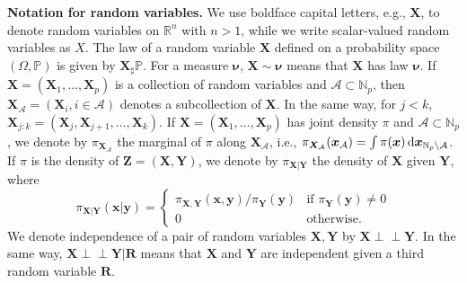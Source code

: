 \documentclass[twoside,11pt]{article}
\newcommand{\push}{_\sharp}                                      %
\newcommand{\orth}{ \perp\!\!\!\perp }  %
\newcommand{\genm}{\boldsymbol{\nu} }   %
\newcommand{\re}{\mathbb{R}}
\newcommand{\Ac}{\mathcal{A}}
\newcommand{\Xb}{\boldsymbol{X}}
\newcommand{\xb}{\boldsymbol{x}}
\newcommand{\Yb}{\boldsymbol{Y}}
\newcommand{\yb}{\boldsymbol{y}}
\newcommand{\Zb}{\boldsymbol{Z}}
\newcommand{\Rb}{\boldsymbol{R}}
\newcommand{\Pbb}{\mathbb{P}}
\begin{document}
{\bf Notation for random variables.}
%
%
%
%
%
%
%
%
%
We use boldface capital letters, e.g., $\Xb$, to 
denote random variables on
%
%
$\re^n$
with $n>1$, while we write 
%
%
%
%
%
scalar-valued
random variables as $X$.
%
The law of a random variable $\Xb$ defined on a probability space
$(\Omega,\Pbb)$ is given by %
%
%
%
$\Xb \push\Pbb$. 
%
%
%
%
%
%
%
%
%
For a measure $\genm$,
%
$\Xb \sim \genm$ means that
$\Xb$ has law $\genm$.
%
%
%
%
%
%
If $\Xb=(\Xb_1,\ldots,\Xb_p)$ 
%
%
%
%
%
is a collection of 
random variables and $\Ac \subset \mathbb{N}_p$, then 
$\Xb_{\Ac}=(\Xb_i, i\in\Ac)$ denotes a subcollection of $\Xb$.
In the same way, for $j < k$, $\Xb_{j:k}=(\Xb_j,\Xb_{j+1},\ldots, \Xb_k)$.
%
If $\Xb=(\Xb_1,\ldots,\Xb_p)$ has joint
density $\pi$ and $\Ac \subset \mathbb{N}_p$,  
we denote by $\pi_{\Xb_{\Ac}}$ the marginal of $\pi$ along $\Xb_{\Ac}$, i.e.,
$\pi_{\Xb_{\Ac}}(\xb_{\Ac}) = \int \pi(\xb)\,{\rm d}\xb_{\mathbb{N}_p \setminus \Ac}$.
%
%
If %
$\pi$  %
is the density of 
$\Zb=(\Xb, \Yb)$, we denote by 
%
$\pi_{\Xb \vert \Yb}$
the density
of $\Xb$ given $\Yb$, where
\begin{equation} \label{eq:cond_density}
  \pi_{\Xb \vert \Yb}(\xb \vert \yb) = 
  \begin{cases} 
  \pi_{\Xb,\Yb}(\xb, \yb)/\pi_{\Yb}(\yb) &\mbox{if }  \pi_{\Yb}(\yb) \neq 0  \\ 
  0 & \mbox{otherwise}.
  \end{cases}
\end{equation}
%
%
%
%
%
%
%
%
%
%
%
%
%
%
%
%
%
%
We denote independence of a pair of random variables $\Xb,\Yb$ by 
  $\Xb \orth \Yb$. In the same way, $\Xb \orth \Yb \vert \Rb$ means
  that $\Xb$ and $\Yb$ are independent given a third random variable $\Rb$.
%
%
%
%
%
%

%
%
%
%
%








 


\end{document}
